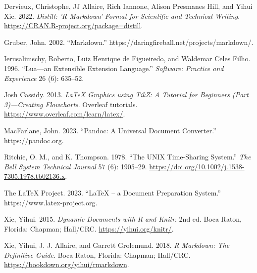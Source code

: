 \hypertarget{refs}{}
\begin{CSLReferences}{1}{0}
\leavevmode{}%
Dervieux, Christophe, JJ Allaire, Rich Iannone, Alison Presmanes Hill, and Yihui Xie. 2022. \emph{Distill: 'R Markdown' Format for Scientific and Technical Writing}. \url{https://CRAN.R-project.org/package=distill}.

\leavevmode{}%
Gruber, John. 2002. {``Markdown.''} https://daringfireball.net/projects/markdown/.

\leavevmode{}%
Ierusalimschy, Roberto, Luiz Henrique de Figueiredo, and Waldemar Celes Filho. 1996. {``Lua---an Extensible Extension Language.''} \emph{Software: Practice and Experience} 26 (6): 635--52.

\leavevmode{}%
Josh Cassidy. 2013. \emph{{LaTeX Graphics using TikZ: A Tutorial for Beginners (Part 3)---Creating Flowcharts}}. Overleaf tutorials. \url{https://www.overleaf.com/learn/latex/}.

\leavevmode{}%
MacFarlane, John. 2023. {``Pandoc: A Universal Document Converter.''} https://pandoc.org.

\leavevmode{}%
Ritchie, O. M., and K. Thompson. 1978. {``The UNIX Time-Sharing System.''} \emph{The Bell System Technical Journal} 57 (6): 1905--29. \url{https://doi.org/10.1002/j.1538-7305.1978.tb02136.x}.

\leavevmode{}%
The LaTeX Project. 2023. {``LaTeX -- a Document Preparation System.''} https://www.latex-project.org.

\leavevmode{}%
Xie, Yihui. 2015. \emph{Dynamic Documents with {R} and Knitr}. 2nd ed. Boca Raton, Florida: Chapman; Hall/CRC. \url{https://yihui.org/knitr/}.

\leavevmode{}%
Xie, Yihui, J. J. Allaire, and Garrett Grolemund. 2018. \emph{R Markdown: The Definitive Guide}. Boca Raton, Florida: Chapman; Hall/CRC. \url{https://bookdown.org/yihui/rmarkdown}.

\end{CSLReferences}



\address{%
Abhishek Ulayil\\
Institute of Actuaries of India (student)\\%
Mumbai, India\\
%
%
\textit{ORCiD: \href{https://orcid.org/0009-0000-6935-8690}{0009-0000-6935-8690}}\\%
\href{mailto:perricoq@outlook.com}{\nolinkurl{perricoq@outlook.com}}%
}

